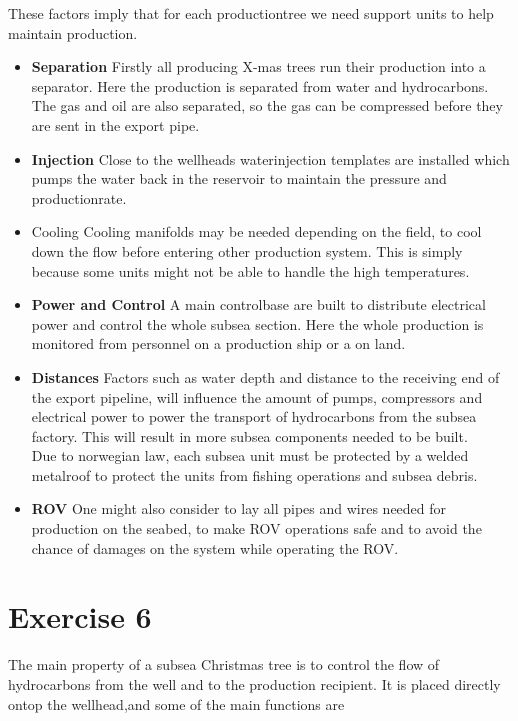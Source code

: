 \documentclass[a4paper,norsk]{article}
\begin{document}
These factors imply that for each productiontree we need support units to help maintain production.
\begin{itemize}

\item \textbf{Separation}
 Firstly all producing X-mas trees run their production into a separator. Here the production is separated from water and hydrocarbons. The gas and oil are also separated, so the gas can be compressed before they are sent in the export pipe.
\item \textbf{Injection}
Close to the wellheads waterinjection templates are installed which pumps the water back in the reservoir to maintain the pressure and productionrate.

\item{Cooling}
Cooling manifolds may be needed depending on the field, to cool down the flow before entering other production system. This is simply because some units might not be able to handle the high temperatures. 

\item \textbf{Power and Control}
A main controlbase are built to distribute electrical power and control the whole subsea section. Here the whole production is monitored from personnel on a production ship or a on land. \\
\item \textbf{Distances}
Factors such as water depth and distance to the receiving end of the export pipeline, will influence the amount of pumps, compressors and electrical power to power the transport of hydrocarbons from the subsea factory. This will result in more subsea components needed to be built. \\
Due to norwegian law, each subsea unit must be protected by a 
welded metalroof to protect the units from fishing operations and subsea debris. \\ 
\item \textbf{ROV}
One might also consider to lay all pipes and wires needed for production on the seabed, to make ROV operations safe and to avoid the chance of damages on the system while operating the ROV.
\end{itemize}



\section*{Exercise 6}
The main property of a subsea Christmas tree is to control the flow of hydrocarbons from the well and to the production recipient. It is placed directly ontop the wellhead,and some of the main functions are
\end{document}
